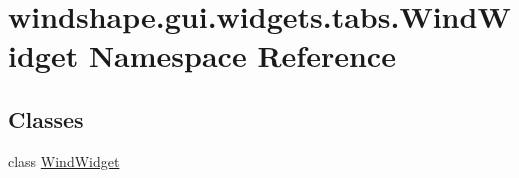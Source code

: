 \hypertarget{namespacewindshape_1_1gui_1_1widgets_1_1tabs_1_1_wind_widget}{}\section{windshape.\+gui.\+widgets.\+tabs.\+Wind\+Widget Namespace Reference}
\label{namespacewindshape_1_1gui_1_1widgets_1_1tabs_1_1_wind_widget}
\subsection*{Classes}
\begin{DoxyCompactItemize}
\item 
class \mbox{\hyperlink{classwindshape_1_1gui_1_1widgets_1_1tabs_1_1_wind_widget_1_1_wind_widget}{Wind\+Widget}}
\end{DoxyCompactItemize}
